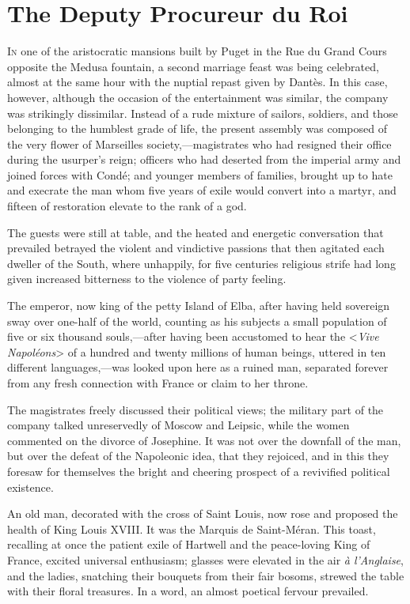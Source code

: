 \chapter{The Deputy Procureur du Roi} 

 \lettrine{I}{n} one of the aristocratic mansions built by Puget in the Rue du Grand Cours opposite the Medusa fountain, a second marriage feast was being celebrated, almost at the same hour with the nuptial repast given by Dantès. In this case, however, although the occasion of the entertainment was similar, the company was strikingly dissimilar. Instead of a rude mixture of sailors, soldiers, and those belonging to the humblest grade of life, the present assembly was composed of the very flower of Marseilles society,—magistrates who had resigned their office during the usurper's reign; officers who had deserted from the imperial army and joined forces with Condé; and younger members of families, brought up to hate and execrate the man whom five years of exile would convert into a martyr, and fifteen of restoration elevate to the rank of a god. 

 The guests were still at table, and the heated and energetic conversation that prevailed betrayed the violent and vindictive passions that then agitated each dweller of the South, where unhappily, for five centuries religious strife had long given increased bitterness to the violence of party feeling. 

 The emperor, now king of the petty Island of Elba, after having held sovereign sway over one-half of the world, counting as his subjects a small population of five or six thousand souls,—after having been accustomed to hear the <\textit{Vive Napoléons}> of a hundred and twenty millions of human beings, uttered in ten different languages,—was looked upon here as a ruined man, separated forever from any fresh connection with France or claim to her throne. 

 The magistrates freely discussed their political views; the military part of the company talked unreservedly of Moscow and Leipsic, while the women commented on the divorce of Josephine. It was not over the downfall of the man, but over the defeat of the Napoleonic idea, that they rejoiced, and in this they foresaw for themselves the bright and cheering prospect of a revivified political existence. 

 An old man, decorated with the cross of Saint Louis, now rose and proposed the health of King Louis XVIII. It was the Marquis de Saint-Méran. This toast, recalling at once the patient exile of Hartwell and the peace-loving King of France, excited universal enthusiasm; glasses were elevated in the air \textit{à l'Anglaise}, and the ladies, snatching their bouquets from their fair bosoms, strewed the table with their floral treasures. In a word, an almost poetical fervour prevailed. 

